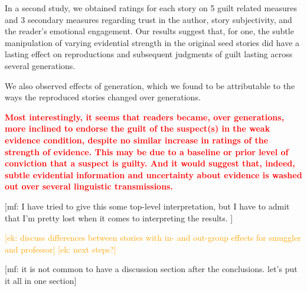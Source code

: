 \documentclass[10pt,letterpaper]{article}
\newcommand{\ek}[1]{\textcolor{Orange}{[ek: #1]}}
\newcommand{\mf}[1]{\textcolor{PinkyPurple}{[mf: #1]}}
\begin{document}
In a second study, we obtained ratings for each story on 5 guilt related measures and 3 secondary measures regarding trust in the author, story subjectivity, and the reader's emotional engagement. Our results suggest that, for one, the subtle manipulation of varying evidential strength in the original seed stories did have a lasting effect on reproductions and subsequent judgments of guilt lasting across several generations.  %

We also observed effects of generation, which we found to be attributable to the ways the reproduced stories changed over generations.

\textbf{\textcolor{red}{ Most interestingly, it seems that readers became, over generations, more inclined to endorse the guilt of the suspect(s) in the weak evidence condition, despite no similar increase in ratings of the strength of evidence. This may be due to a baseline or prior level of conviction that a suspect is guilty. And it would suggest that, indeed, subtle evidential information and uncertainty about evidence is washed out over several linguistic transmissions.}}

\mf{I have tried to give this some top-level interpretation, but I have to admit that I'm pretty lost when it comes to interpreting the results. }

    
\ek{discuss differences between stories with in- and out-group effects for smuggler and professor}
\ek{next steps?}

\mf{it is not common to have a discussion section after the conclusions. let's put it all in one section}



\setlength{\bibleftmargin}{.125in}
\setlength{\bibindent}{-\bibleftmargin}
\end{document}
